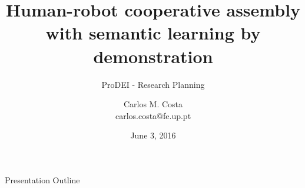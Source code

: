 





\title{Human-robot cooperative assembly with semantic learning by demonstration}
\subtitle{ProDEI - Research Planning}
\author{Carlos M. Costa\texorpdfstring{\\{\ttfamily carlos.costa@fe.up.pt}}{}}
\date{June 3, 2016}




\begin{frame}
	\titlepage
\end{frame}




\begin{frame}{Presentation Outline}
	\tableofcontents
\end{frame}













